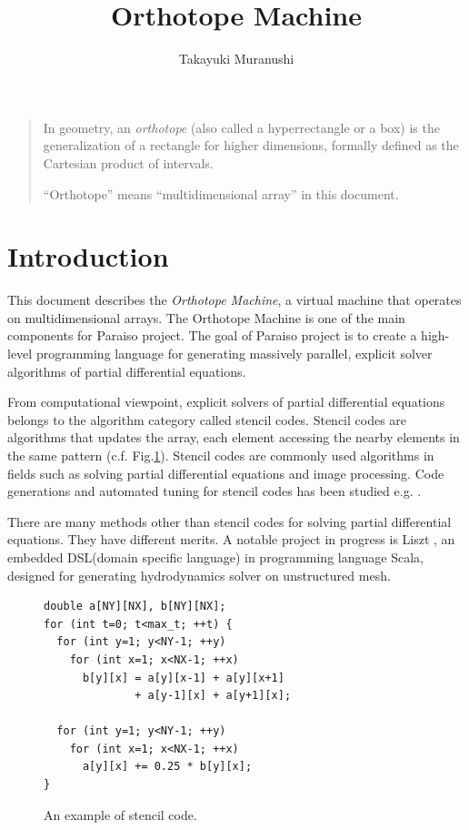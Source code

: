\documentclass[twocolumn]{article}
\title{Orthotope Machine}
\author{Takayuki Muranushi}
\begin{document}
\maketitle
\begin{quote}
  In geometry, an {\em orthotope} (also called a hyperrectangle or a box) is
  the generalization of a rectangle for higher dimensions, formally
  defined as the Cartesian product of intervals.

  ``Orthotope'' means ``multidimensional array'' in this document.
\end{quote}

\section{Introduction}

This document describes the {\em Orthotope Machine}, a virtual machine that
operates on multidimensional arrays. The Orthotope Machine is one of the main
components for Paraiso project. The goal of Paraiso project is to create a
high-level programming language for generating massively parallel, explicit
solver algorithms of partial differential equations. 


From computational viewpoint, explicit solvers of partial differential
equations belongs to the algorithm category called stencil codes. Stencil
codes are algorithms that updates the array, each element accessing the nearby
elements in the same pattern (c.f. Fig.\ref{FigureStencilPseudoCode}). Stencil
codes are commonly used algorithms in fields such as solving partial
differential equations and image processing. Code generations and automated
tuning for stencil codes has been studied e.g. \cite{Datta:EECS-2009-177,
  Datta:2008:SCO:1413370.1413375}.

There are many methods other than stencil codes for solving partial
differential equations. They have different merits. A notable project in
progress is Liszt \cite{Chafi:2010:LVH:1932682.1869527}, an embedded
DSL(domain specific language) in programming language Scala, designed for
generating hydrodynamics solver on unstructured mesh.

\begin{figure}
\begin{verbatim}
double a[NY][NX], b[NY][NX];
for (int t=0; t<max_t; ++t) {
  for (int y=1; y<NY-1; ++y) 
    for (int x=1; x<NX-1; ++x) 
      b[y][x] = a[y][x-1] + a[y][x+1] 
              + a[y-1][x] + a[y+1][x];

  for (int y=1; y<NY-1; ++y) 
    for (int x=1; x<NX-1; ++x) 
      a[y][x] += 0.25 * b[y][x];
}
\end{verbatim}
\caption{An example of stencil code.}\label{FigureStencilPseudoCode}
\end{figure}
\end{document}
